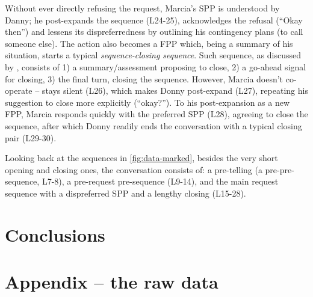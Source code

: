 \documentclass[11pt]{article}
\begin{document}
{	Without ever directly refusing the request, Marcia's SPP is understood by Danny; he post-expands the sequence (L24-25), acknowledges the refusal (``Okay then'') and lessens its dispreferredness by outlining his contingency plans (to call someone else). The action also becomes a FPP which, being a summary of his situation, starts a typical \textit{sequence-closing sequence}. Such sequence, as discussed by \citet[p.~168]{Liddicoat_2007}, consists of 1) a summary/assessment proposing to close, 2) a go-ahead signal for closing, 3) the final turn, closing the sequence. However, Marcia doesn't co-operate -- stays silent (L26), which makes Donny post-expand (L27), repeating his suggestion to close more explicitly (``okay?''). To his post-expansion as a new FPP, Marcia responds quickly with the preferred SPP (L28), agreeing to close the sequence, after which Donny readily ends the conversation with a typical closing pair (L29-30).

	Looking back at the sequences in \autoref{fig:data-marked}, besides the very short opening and closing ones, the conversation consists of: a pre-telling (a pre-pre-sequence, L7-8), a pre-request pre-sequence (L9-14), and the main request sequence with a dispreferred SPP and a lengthy closing (L15-28).
}

\section{Conclusions}{

}




\section*{Appendix -- the raw data}{

}
\end{document}
